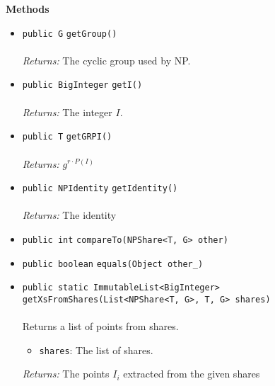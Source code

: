 \textbf{\sffamily Methods}
\begin{itemize}
\item \lstinline|public G| \lstinline|getGroup|\lstinline|()|\\ \\[-0.6em]
\emph{Returns:} The cyclic group used by NP.



\item \lstinline|public BigInteger| \lstinline|getI|\lstinline|()|\\ \\[-0.6em]
\emph{Returns:} The integer $I$.



\item \lstinline|public T| \lstinline|getGRPI|\lstinline|()|\\ \\[-0.6em]
\emph{Returns:} $g^{r \cdot P(I)}$



\item \lstinline|public NPIdentity| \lstinline|getIdentity|\lstinline|()|\\ \\[-0.6em]
\emph{Returns:} The identity



\item \lstinline|public int| \lstinline|compareTo|\lstinline|(NPShare<T, G> other)| \\[-0.6em]




\item \lstinline|public boolean| \lstinline|equals|\lstinline|(Object other_)| \\[-0.6em]




\item \lstinline|public static ImmutableList<BigInteger>| \lstinline|getXsFromShares|\lstinline|(List<NPShare<T, G>, T, G> shares)|\\ \\[-0.6em]
Returns a list of points from shares.
\begin{itemize}
\item \lstinline|shares|: The list of shares.
\end{itemize}

\emph{Returns:} The points $I_i$ extracted from the given shares

\end{itemize}


